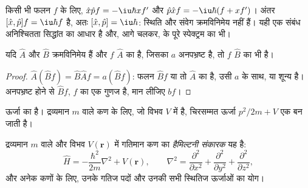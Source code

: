 \begin{example}[विहित क्रमविनिमेयक]\label{ex:b3:quantum-model-systems:canonical}
किसी भी फलन $f$ के लिए, $\hat x\hat pf = -\iu\hbar xf'$ और $\hat p\hat xf =
-\iu\hbar(f + xf')$। अंतर $[\hat x,\hat p]f = \iu\hbar f$ है, अतः
$[\hat x,\hat p] = \iu\hbar$: स्थिति और संवेग क्रमविनिमेय नहीं हैं। यही
एक संबंध अनिश्चितता सिद्धांत का आधार है और, आगे चलकर,  के पूरे
स्पेक्ट्रम का भी।
\end{example}

\begin{proposition}[क्रमविनिमेय संकारक]\label{prop:b3:quantum-model-systems:commuting}
यदि $\hat A$ और $\hat B$ क्रमविनिमेय हैं और $f$  $\hat A$ का  है,
जिसका  $a$ अनपभ्रष्ट है, तो $f$
 $\hat B$ का भी  है।
\end{proposition}

\begin{proof}
$\hat A(\hat Bf) = \hat B\hat Af = a(\hat Bf)$: फलन $\hat Bf$ या तो
$\hat A$ का  है, उसी  $a$ के साथ, या शून्य है।
 अनपभ्रष्ट होने से $\hat Bf$, $f$ का एक गुणज है, मान लीजिए $bf$।
\end{proof}

ऊर्जा का   है। द्रव्यमान $m$ वाले कण के लिए, जो विभव
$V$ में है, चिरसम्मत ऊर्जा $p^2/2m + V$ एक  बन जाती है।

\begin{definition}[हैमिल्टनी संकारक]\label{def:b3:quantum-model-systems:schrodinger}
द्रव्यमान $m$ वाले और विभव $V(\mathbf r)$ में गतिमान कण का
\emph{हैमिल्टनी संकारक} यह है:
\[
\hat H = -\frac{\hbar^2}{2m}\nabla^2 + V(\mathbf r), \qquad \nabla^2 =
\frac{\partial^2}{\partial x^2} + \frac{\partial^2}{\partial y^2} +
\frac{\partial^2}{\partial z^2},
\]
और अनेक कणों के लिए, उनके गतिज पदों और उनकी सभी स्थितिज ऊर्जाओं का
योग।
\end{definition}

